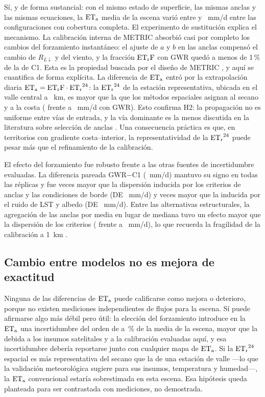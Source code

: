 Sí, y de forma sustancial: con el mismo estado de superficie, las mismas
anclas y las mismas ecuaciones, la $\mathrm{ET_a}$ media de la escena varió entre
\MEtaCTwoIDWMean{} y \MEtaCOneLapMean~mm/d entre las configuraciones con
cobertura completa. El experimento de sustitución explica el mecanismo. La calibración
interna de METRIC absorbió casi por completo los cambios del forzamiento
instantáneo: el ajuste de $a$ y $b$ en las anclas compensó el cambio de
$R_{L\downarrow}$ y del viento, y la fracción $\mathrm{ET_rF}$ con GWR quedó a menos de
1\,\% de la de C1. Esta es la propiedad buscada por el diseño de METRIC
\parencite{allen2007metric1}, y aquí se cuantifica de forma explícita. La
diferencia de $\mathrm{ET_a}$ entró por la extrapolación diaria $\mathrm{ET_a} = \mathrm{ET_rF}\cdot\mathrm{ET_r}^{24}$:
la $\mathrm{ET_r}^{24}$ de la estación representativa, ubicada en el valle central a
\RepStationDist~km, es mayor que la que los métodos espaciales asignan al
secano y a la costa (\MFEtrDayCOneMean{} frente a \MFEtrDayCThreeGWRMean~mm/d
con GWR). Esto confirma H2: la
propagación no es uniforme entre vías de entrada, y la vía dominante es la
menos discutida en la literatura sobre selección de anclas
\parencite{long2013endmember,bhattarai2017endmember}. Una consecuencia
práctica es que, en territorios con gradiente costa--interior, la
representatividad de la $\mathrm{ET_r}^{24}$ puede pesar más que el refinamiento de
la calibración.

El efecto del forzamiento fue robusto frente a las otras fuentes de
incertidumbre evaluadas. La diferencia pareada GWR$-$C1 (\SAEffMean~mm/d)
mantuvo su signo en todas las réplicas y fue \RatioSA{} veces mayor que la
dispersión inducida por los criterios de anclas y las condiciones de borde
(DE \SACOneSd~mm/d) y \RatioSB{} veces mayor que la inducida por el ruido de
LST y albedo (DE \SBCOneSd~mm/d). Entre las alternativas estructurales, la
agregación de las anclas por media en lugar de mediana tuvo un efecto mayor
que la dispersión de los criterios (\SCAggregateMeanCOne{} frente a
\SCBaseCOne~mm/d), lo que recuerda la fragilidad de la calibración a 1~km
\parencite{tang2013scale,long2011sebalsensitivity}.

\subsection{Cambio entre modelos no es mejora de exactitud}

Ninguna de las diferencias de $\mathrm{ET_a}$ puede calificarse como mejora o
deterioro, porque no existen mediciones independientes de flujos para la
escena. Sí puede afirmarse algo más débil pero útil: la elección del
forzamiento introduce en la $\mathrm{ET_a}$ una incertidumbre del orden de
\DEtaCThreeGWRPct{} a \DEtaCTwoIDWPct\,\% de la media de la escena, mayor que
la debida a los insumos satelitales y a la calibración evaluadas aquí, y esa
incertidumbre debería reportarse junto con cualquier mapa de $\mathrm{ET_a}$. Si la
$\mathrm{ET_r}^{24}$ espacial es más representativa del secano que la de una estación
de valle ---lo que la validación meteorológica sugiere para sus insumos,
temperatura y humedad---, la $\mathrm{ET_a}$ convencional estaría sobrestimada en esta
escena. Esa hipótesis queda planteada para ser contrastada con mediciones,
no demostrada.

